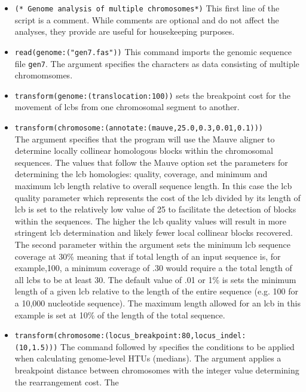 \begin{itemize}
\item \texttt{(* Genome analysis of multiple chromosomes*)} This first line of the script is a comment. While 
comments are optional and do not affect the analyses, they provide are useful for housekeeping purposes.
\item \texttt{read(genome:("gen7.fas"))} This command imports the genomic sequence file \texttt{gen7}. The 
argument  specifies the characters as data consisting of multiple chromomsomes.
\item \texttt{transform(genome:(translocation:100))} sets the breakpoint cost for the movement of lcbs from one 
chromosomal segment to another. 
\item \texttt{transform(chromosome:(annotate:(mauve,25.0,0.3,0.01,0.1)))} \\The argument  specifies that the program will use the Mauve aligner \cite{darlingetal2004} to determine locally collinear 
homologous blocks within the chromosomal sequences.  The values that follow the Mauve option set the parameters 
for determining the lcb homologies: quality, coverage, and minimum and maximum lcb length relative to overall 
sequence length. In this case the lcb quality parameter which represents the cost of the lcb divided by its length of lcb
 is set to the relatively low value of 25 to facilitate the detection of blocks within the sequences.  The higher the lcb 
 quality values will result in more stringent lcb determination and likely fewer local collinear blocks recovered.  The 
 second parameter within the argument  sets the minimum lcb sequence coverage 
 at  30\% meaning that if total length of an input sequence is, for example,100, a minimum coverage of .30 would 
 require  a the total length of all lcbs to be at least 30. The default value of .01 or 1\% is sets the minimum length of a 
 given lcb  relative to the length of the entire sequence (e.g. 100 for a 10,000 nucleotide sequence). The maximum 
 length allowed for an lcb in this example is set at 10\% of the length of the total sequence.
\item \texttt{transform(chromosome:(locus\_breakpoint:80,locus\_indel:\\(10,1.5)))}  The command 
 followed by  specifies the conditions to be 
applied when calculating genome-level HTUs (medians). The argument  
applies a breakpoint distance between chromosomes with the integer value determining the rearrangement cost. The 

\end{itemize}
